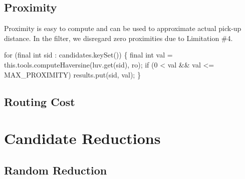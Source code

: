 \section{Proximity}

Proximity is easy to compute and can be used to approximate actual pick-up
distance. In the filter, we disregard zero proximities due to Limitation \#4.

\nwenddocs{}\endmoddef\nwstartdeflinemarkup{}\nwenddeflinemarkup
for (final int sid : candidates.keySet()) \{
  final int val = this.tools.computeHaversine(luv.get(sid), ro);
  if (0 < val && val <= MAX_PROXIMITY)
    results.put(sid, val);
\}
\nwendcode{}\nwdocspar


\section{Routing Cost}


\nwenddocs{}\chapter{Candidate Reductions}
\label{search-reductions}

\section{Random Reduction}

